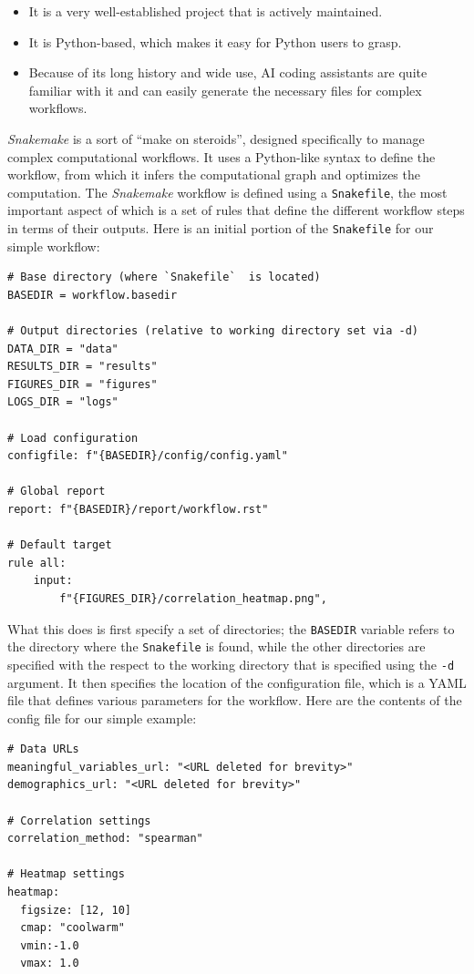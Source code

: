 \begin{itemize}
\item It is a very well-established project that is actively maintained.
\item It is Python-based, which makes it easy for Python users to grasp.
\item Because of its long history and wide use, AI coding assistants are quite familiar with it and can easily generate the necessary files for complex workflows.
\end{itemize}

\textit{Snakemake} is a sort of ``make on steroids'', designed specifically to manage complex computational workflows.  It uses a Python-like syntax to define the workflow, from which it infers the computational graph and optimizes the computation. The \textit{Snakemake} workflow is defined using a \texttt{Snakefile}, the most important aspect of which is a set of rules that define the different workflow steps in terms of their outputs.  Here is an initial portion of the \texttt{Snakefile} for our simple workflow:

\begin{lstlisting}[style=Python]
# Base directory (where `Snakefile`  is located)
BASEDIR = workflow.basedir

# Output directories (relative to working directory set via -d)
DATA_DIR = "data"
RESULTS_DIR = "results"
FIGURES_DIR = "figures"
LOGS_DIR = "logs"

# Load configuration
configfile: f"{BASEDIR}/config/config.yaml"

# Global report
report: f"{BASEDIR}/report/workflow.rst"

# Default target
rule all:
    input:
        f"{FIGURES_DIR}/correlation_heatmap.png",
\end{lstlisting}

What this does is first specify a set of directories; the \texttt{BASEDIR} variable refers to the directory where the \texttt{Snakefile}  is found, while the other directories are specified with the respect to the working directory that is specified using the \texttt{-d} argument.  It then specifies the location of the configuration file, which is a YAML file that defines various parameters for the workflow.  Here are the contents of the config file for our simple example:

\begin{lstlisting}[style=yaml]
# Data URLs
meaningful_variables_url: "<URL deleted for brevity>"
demographics_url: "<URL deleted for brevity>"

# Correlation settings
correlation_method: "spearman"

# Heatmap settings
heatmap:
  figsize: [12, 10]
  cmap: "coolwarm"
  vmin:-1.0
  vmax: 1.0
\end{lstlisting}

